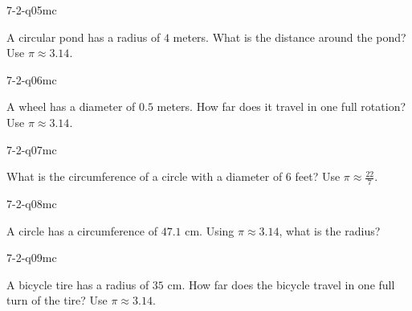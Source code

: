 \begin{practiceQuestion}{7-2-q05}{mc}
\begin{questionText}
A circular pond has a radius of $4$ meters. What is the distance around the pond? Use $\pi \approx 3.14$.
\end{questionText}
\end{practiceQuestion}

\begin{practiceQuestion}{7-2-q06}{mc}
\begin{questionText}
A wheel has a diameter of $0.5$ meters. How far does it travel in one full rotation? Use $\pi \approx 3.14$.
\end{questionText}
\end{practiceQuestion}

\begin{practiceQuestion}{7-2-q07}{mc}
\begin{questionText}
What is the circumference of a circle with a diameter of $6$ feet? Use $\pi \approx \frac{22}{7}$.
\end{questionText}
\end{practiceQuestion}

\begin{practiceQuestion}{7-2-q08}{mc}
\begin{questionText}
A circle has a circumference of $47.1$ cm. Using $\pi \approx 3.14$, what is the radius?
\end{questionText}
\end{practiceQuestion}

\begin{practiceQuestion}{7-2-q09}{mc}
\begin{questionText}
A bicycle tire has a radius of $35$ cm. How far does the bicycle travel in one full turn of the tire? Use $\pi \approx 3.14$.
\end{questionText}
\end{practiceQuestion}

